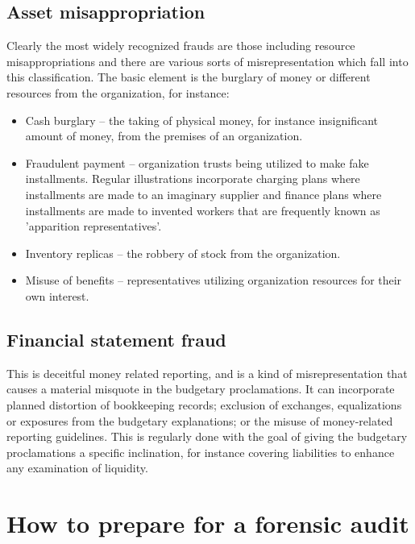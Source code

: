 \subsection{Asset misappropriation}
Clearly the most widely recognized frauds are those including resource misappropriations and there are various sorts of misrepresentation which fall into this classification. The basic element is the burglary of money or different resources from the organization, for instance: 

\begin{itemize}
\item Cash burglary – the taking of physical money, for instance insignificant amount of money, from the premises of an organization.
\item Fraudulent payment – organization trusts being utilized to make fake installments. Regular illustrations incorporate charging plans where installments are made to an imaginary supplier and finance plans where installments are made to invented workers that are frequently known as 'apparition representatives'.
\item Inventory replicas – the robbery of stock from the organization. 
\item Misuse of benefits – representatives utilizing organization resources for their own interest.
\end{itemize}


\subsection{Financial statement fraud}

This is deceitful money related reporting, and is a kind of misrepresentation that causes a material misquote in the budgetary proclamations. It can incorporate planned distortion of bookkeeping records; exclusion of exchanges, equalizations or exposures from the budgetary explanations; or the misuse of money-related reporting guidelines. This is regularly done with the goal of giving the budgetary proclamations a specific inclination, for instance covering liabilities to enhance any examination of liquidity.





\section{How to prepare for a forensic audit}

